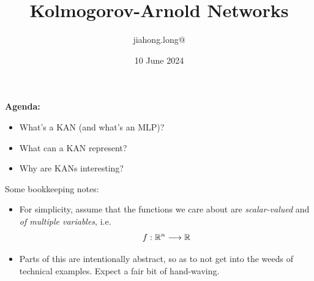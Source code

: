 


\title{\bf Kolmogorov-Arnold Networks}
\author{jiahong.long@}
\date{10 June 2024}



\frame{\titlepage}

\begin{frame}
\end{frame}

\begin{frame}
    \textbf{Agenda:}
    \begin{itemize}
        \item What's a KAN (and what's an MLP)?
        \item What can a KAN represent?
        \item Why are KANs interesting?
    \end{itemize}
\end{frame}

\begin{frame}
    Some bookkeeping notes:
    \begin{itemize}
        \item For simplicity, assume that the functions we care about are
            \textit{scalar-valued} and \textit{of multiple variables}, i.e. 
            \[
                f: \mathbb{R}^n \longrightarrow \mathbb{R}
            \]
        \item Parts of this are intentionally abstract, so as to not get
            into the weeds of technical examples. Expect a fair bit of hand-waving.
    \end{itemize}
\end{frame}

\begin{frame}
\end{frame}

